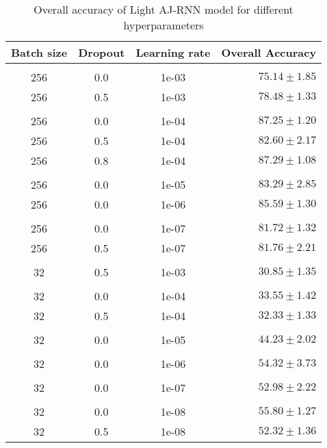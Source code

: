 \begin{table}[H]
  \centering
  \begin{tabular}{cccr} 
      Batch size & Dropout & Learning rate & Overall Accuracy\\[0.2cm] 
      \hline \\[-0.2cm]
      256 & 0.0 & 1e-03 & $75.14 \pm 1.85$\\
      256 & 0.5 & 1e-03 & $78.48 \pm 1.33$\\[0.05cm] \hline \\[-0.25cm]

      256 & 0.0 & 1e-04 & $87.25 \pm 1.20$\\
      256 & 0.5 & 1e-04 & $82.60 \pm 2.17$\\
      256 & 0.8 & 1e-04 & $\mathbf{87.29 \pm 1.08}$\\[0.05cm] \hline \\[-0.25cm]

      256 & 0.0 & 1e-05 & $83.29 \pm 2.85$\\
      256 & 0.0 & 1e-06 & $85.59 \pm 1.30$\\[0.05cm] \hline \\[-0.25cm]

      256 & 0.0 & 1e-07 & $81.72 \pm 1.32$\\
      256 & 0.5 & 1e-07 & $81.76 \pm 2.21$\\[0.05cm] \hline \\[-0.25cm]

      32  & 0.5 & 1e-03 & $30.85 \pm 1.35$\\[0.05cm] \hline \\[-0.25cm]

      32  & 0.0 & 1e-04 & $33.55 \pm 1.42$\\
      32  & 0.5 & 1e-04 & $32.33 \pm 1.33$\\[0.05cm] \hline \\[-0.25cm]

      32  & 0.0 & 1e-05 & $44.23 \pm 2.02$\\[0.05cm] \hline \\[-0.25cm]
      32  & 0.0 & 1e-06 & $54.32 \pm 3.73$\\[0.05cm] \hline \\[-0.25cm]
      32  & 0.0 & 1e-07 & $52.98 \pm 2.22$\\[0.05cm] \hline \\[-0.25cm]
      32  & 0.0 & 1e-08 & $\mathbf{55.80 \pm 1.27}$\\
      32  & 0.5 & 1e-08 & $52.32 \pm 1.36$\\
  \end{tabular}
  \caption{Overall accuracy of Light AJ-RNN model for different hyperparameters}
  \label{tab:LightAJRNNBatchSizeResults}
\end{table}

